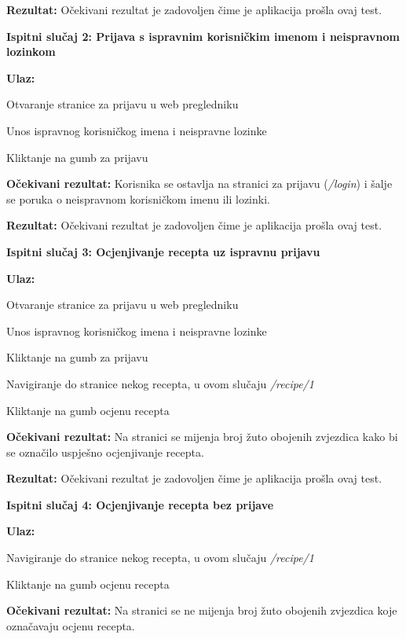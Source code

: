 			\noindent\textbf{Rezultat:} Očekivani rezultat je zadovoljen čime je aplikacija prošla ovaj test.\linebreak
			
			\noindent\textbf{Ispitni slučaj 2: Prijava s ispravnim korisničkim imenom i neispravnom lozinkom}
			
			\noindent\textbf{Ulaz:}
			\begin{packed_enum}
				\item Otvaranje stranice za prijavu u web pregledniku
				\item Unos ispravnog korisničkog imena i neispravne lozinke
				\item Kliktanje na gumb za prijavu
			\end{packed_enum}
			\textbf{Očekivani rezultat:} Korisnika se ostavlja na stranici za prijavu (\textit{/login}) i šalje se poruka o neispravnom korisničkom imenu ili lozinki.
			
			\noindent\textbf{Rezultat:} Očekivani rezultat je zadovoljen čime je aplikacija prošla ovaj test.\linebreak
			
			\noindent\textbf{Ispitni slučaj 3: Ocjenjivanje recepta uz ispravnu prijavu}
			
			\noindent\textbf{Ulaz:}
			\begin{packed_enum}
				\item Otvaranje stranice za prijavu u web pregledniku
				\item Unos ispravnog korisničkog imena i neispravne lozinke
				\item Kliktanje na gumb za prijavu
				\item Navigiranje do stranice nekog recepta, u ovom slučaju \textit{/recipe/1}
				\item Kliktanje na gumb ocjenu recepta
			\end{packed_enum}
			\textbf{Očekivani rezultat:} Na stranici se mijenja broj žuto obojenih zvjezdica kako bi se označilo uspješno ocjenjivanje recepta.
			
			\noindent\textbf{Rezultat:} Očekivani rezultat je zadovoljen čime je aplikacija prošla ovaj test.\linebreak
			
			\noindent\textbf{Ispitni slučaj 4: Ocjenjivanje recepta bez prijave}
			
			\noindent\textbf{Ulaz:}
			\begin{packed_enum}
				\item Navigiranje do stranice nekog recepta, u ovom slučaju \textit{/recipe/1}
				\item Kliktanje na gumb ocjenu recepta
			\end{packed_enum}
			\textbf{Očekivani rezultat:} Na stranici se ne mijenja broj žuto obojenih zvjezdica koje označavaju ocjenu recepta.
			
